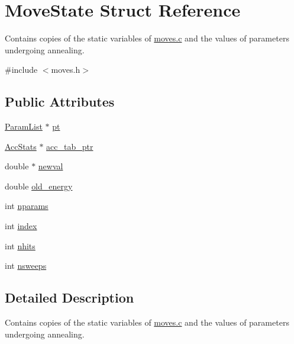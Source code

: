 \hypertarget{structMoveState}{
\section{MoveState Struct Reference}
\label{structMoveState}
}


Contains copies of the static variables of \hyperlink{moves_8c}{moves.c} and the values of parameters undergoing annealing.  


{\ttfamily \#include $<$moves.h$>$}\subsection*{Public Attributes}
\begin{DoxyCompactItemize}
\item 
\hyperlink{structParamList}{ParamList} $\ast$ \hyperlink{structMoveState_af721df96a567be5b998d9e6c1cdddbfb}{pt}
\item 
\hyperlink{structAccStats}{AccStats} $\ast$ \hyperlink{structMoveState_aaa046f50dfa641c635e4f7a307c60e99}{acc\_\-tab\_\-ptr}
\item 
double $\ast$ \hyperlink{structMoveState_a8f1f4ff4625f8c26fe9440979696b948}{newval}
\item 
double \hyperlink{structMoveState_a8822217e1bf2b4231318e2bf3b2c7d3b}{old\_\-energy}
\item 
int \hyperlink{structMoveState_a22129990f5089434d62c9f7dbede353c}{nparams}
\item 
int \hyperlink{structMoveState_ac7e613b0362356f428c7e1e5bcf09fd5}{index}
\item 
int \hyperlink{structMoveState_a17a8c4927f949245cdc6a6508e927b6b}{nhits}
\item 
int \hyperlink{structMoveState_a4f90403ee79669e85a6334b704f791b9}{nsweeps}
\end{DoxyCompactItemize}


\subsection{Detailed Description}
Contains copies of the static variables of \hyperlink{moves_8c}{moves.c} and the values of parameters undergoing annealing. 

